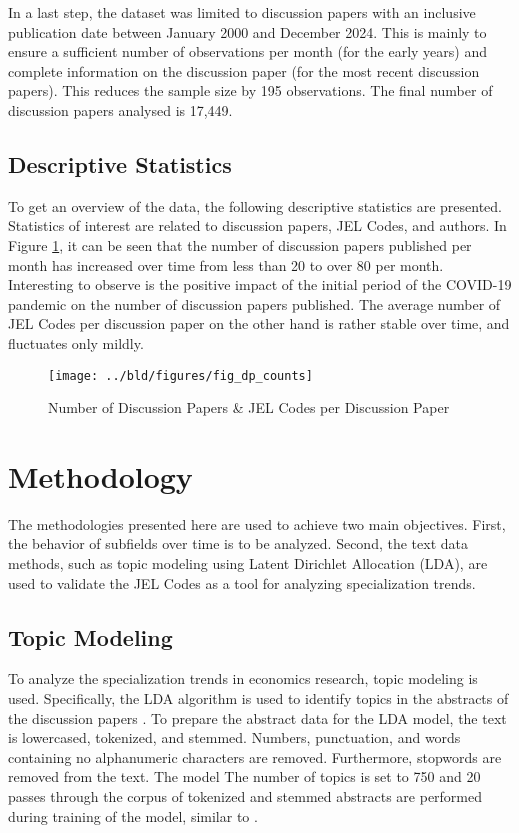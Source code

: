 \documentclass[11pt, a4paper, leqno]{article}
\begin{document}
In a last step, the dataset was limited to discussion papers with an inclusive publication date between January 2000 and December 2024.
This is mainly to ensure a sufficient number of observations per month (for the early years) and complete information on the discussion paper (for the most recent discussion papers).
This reduces the sample size by 195 observations. The final number of discussion papers analysed is 17,449.

\subsection{Descriptive Statistics}
To get an overview of the data, the following descriptive statistics are presented.
Statistics of interest are related to discussion papers, JEL Codes, and authors.
In Figure \ref{fig:dp_counts}, it can be seen that the number of discussion papers published per month has increased over time from less than 20 to over 80 per month.
Interesting to observe is the positive impact of the initial period of the COVID-19 pandemic on the number of discussion papers published.
The average number of JEL Codes per discussion paper on the other hand is rather stable over time, and fluctuates only mildly.

\begin{figure}
    \centering
    \texttt{[image: ../bld/figures/fig\_dp\_counts]}
    \caption{Number of Discussion Papers \& JEL Codes per Discussion Paper}
    \label{fig:dp_counts}
\end{figure}

\section{Methodology}
The methodologies presented here are used to achieve two main objectives.
First, the behavior of subfields over time is to be analyzed.
Second, the text data methods, such as topic modeling using Latent Dirichlet Allocation (LDA), are used to validate the JEL Codes as a tool for analyzing specialization trends.

\subsection{Topic Modeling}
To analyze the specialization trends in economics research, topic modeling is used.
Specifically, the LDA algorithm is used to identify topics in the abstracts of the discussion papers \cite{blei2003}.
To prepare the abstract data for the LDA model, the text is lowercased, tokenized, and stemmed.
Numbers, punctuation, and words containing no alphanumeric characters are removed.
Furthermore, stopwords are removed from the text.
The model
The number of topics is set to 750 and 20 passes through the corpus of tokenized and stemmed abstracts are performed during training of the model, similar to \cite{galiani2023a}.
\end{document}
